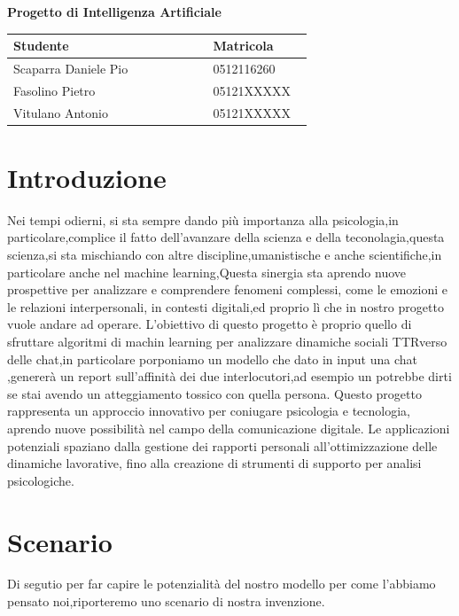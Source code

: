 \documentclass{article}
\begin{document}
\begin{center}
\fontsize{14}{18pt} \selectfont \textbf{Progetto di Intelligenza Artificiale}

\vspace{1cm}

\begin{tabular}{|p{0.6\linewidth}|p{0.3\linewidth}|}
\hline
    \textbf{Studente} & \textbf{Matricola} \\
\hline
    Scaparra Daniele Pio & 0512116260 \\
\hline
    Fasolino Pietro & 05121XXXXX \\
\hline
    Vitulano Antonio & 05121XXXXX \\
\hline
\end{tabular}

\end{center}

\maketitle

\section{Introduzione}\label{sec:introduction}
Nei tempi odierni, si sta sempre dando più importanza alla psicologia,in particolare,complice il fatto dell'avanzare della scienza e della teconolagia,questa scienza,si sta mischiando con altre discipline,umanistische e anche scientifiche,in particolare anche nel machine learning,Questa sinergia sta aprendo nuove prospettive per analizzare e comprendere fenomeni complessi, come le emozioni e le relazioni interpersonali, in contesti digitali,ed proprio lì che in nostro progetto vuole andare ad operare.
L'obiettivo di questo progetto  è proprio quello di sfruttare algoritmi di machin learning per analizzare dinamiche sociali TTRverso delle chat,in particolare porponiamo un modello che dato in input una chat ,genererà un report sull'affinità dei due interlocutori,ad esempio un potrebbe dirti se stai avendo un atteggiamento tossico con quella persona.
Questo progetto rappresenta un approccio innovativo per coniugare psicologia e tecnologia, aprendo nuove possibilità nel campo della comunicazione digitale. Le applicazioni potenziali spaziano dalla gestione dei rapporti personali all’ottimizzazione delle dinamiche lavorative, fino alla creazione di strumenti di supporto per analisi psicologiche.
\section{Scenario}\label{sec:scenario}
Di segutio per far capire le potenzialità del nostro modello per come l'abbiamo pensato noi,riporteremo uno scenario di nostra invenzione.
\end{document}
